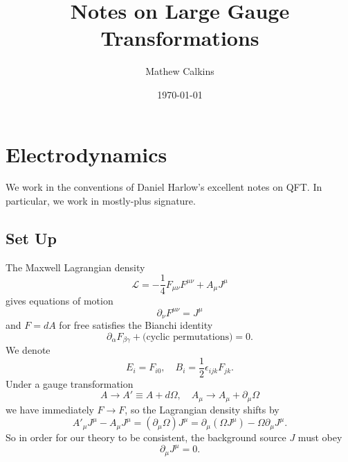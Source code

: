 \documentclass[11pt,letterpaper]{article}
\newcommand{\LP}{\left(}
\newcommand{\RP}{\right)}
\newcommand{\D}{\partial}
\begin{document}
\title{Notes on Large Gauge Transformations}

\author{Mathew Calkins}

\date{\today}

 
\maketitle


\tableofcontents

\section{Electrodynamics}

We work in the conventions of Daniel Harlow's excellent notes on QFT. In particular, we work in mostly-plus signature.

\subsection{Set Up}
The Maxwell Lagrangian density \begin{equation}\label{maxwelllagrangian}
\mathcal{L} = - \frac{1}{4} F_{\mu \nu} F^{\mu \nu} + A_\mu J^\mu
\end{equation}
gives equations of motion \begin{equation}
\D_\nu F^{\mu \nu} = J^\mu
\end{equation}
and $F = dA$ for free satisfies the Bianchi identity \begin{equation}
\D_\alpha F_{\beta \gamma} + \mbox{(cyclic permutations)} = 0.
\end{equation}
We denote \begin{equation}
E_i = F_{i0}, \quad B_i = \frac{1}{2} \epsilon_{ijk} F_{jk}.
\end{equation}
Under a gauge transformation \begin{equation}
A \to A' \equiv A + d \Omega, \quad A_\mu \to A_\mu + \D_\mu \Omega
\end{equation}
we have immediately $F \to F$, so the Lagrangian density shifts by \begin{equation}
A'_\mu J^\mu - A_\mu J^\mu = (\D_\mu \Omega) J^\mu = \D_\mu \LP \Omega J^\mu \RP - \Omega \D_\mu J^\mu.
\end{equation}
So in order for our theory to be consistent, the background source $J$ must obey \begin{equation}
\D_\mu J^\mu = 0.
\end{equation}
\end{document}
